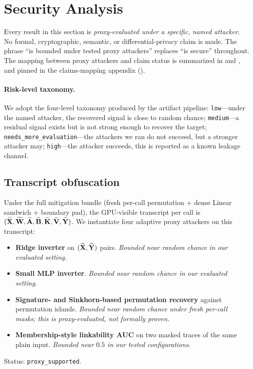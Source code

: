 \section{Security Analysis}
\label{sec:security}

Every result in this section is \emph{proxy-evaluated under a specific, named attacker}. No formal, cryptographic, semantic, or differential-privacy claim is made. The phrase ``is bounded under tested proxy attackers'' replaces ``is secure'' throughout. The mapping between proxy attackers and claim status is summarized in  and , and pinned in the claims-mapping appendix ().

\paragraph{Risk-level taxonomy.}
We adopt the four-level taxonomy produced by the artifact pipeline: \texttt{low}---under the named attacker, the recovered signal is close to random chance; \texttt{medium}---a residual signal exists but is not strong enough to recover the target; \texttt{needs\_more\_evaluation}---the attackers we ran do not succeed, but a stronger attacker may; \texttt{high}---the attacker succeeds, this is reported as a known leakage channel.

\subsection{Transcript obfuscation}
\label{sec:security:transcript}
Under the full mitigation bundle (fresh per-call permutation $+$ dense Linear sandwich $+$ boundary pad), the GPU-visible transcript per call is $(\widetilde{\mathbf{X}}, \widetilde{\mathbf{W}}, \widetilde{\mathbf{A}}, \widetilde{\mathbf{B}}, \widetilde{\mathbf{K}}, \widetilde{\mathbf{V}}, \widetilde{\mathbf{Y}})$. We instantiate four adaptive proxy attackers on this transcript:

\begin{itemize}[leftmargin=*, nosep]
  \item \textbf{Ridge inverter} on $(\widetilde{\mathbf{X}}, \widetilde{\mathbf{Y}})$ pairs. \emph{Bounded near random chance in our evaluated setting.}
  \item \textbf{Small MLP inverter}. \emph{Bounded near random chance in our evaluated setting.}
  \item \textbf{Signature- and Sinkhorn-based permutation recovery} against permutation islands. \emph{Bounded near random chance under fresh per-call masks; this is proxy-evaluated, not formally proven.}
  \item \textbf{Membership-style linkability AUC} on two masked traces of the same plain input. \emph{Bounded near $0.5$ in our tested configurations.}
\end{itemize}
Status: \texttt{proxy\_supported}.

